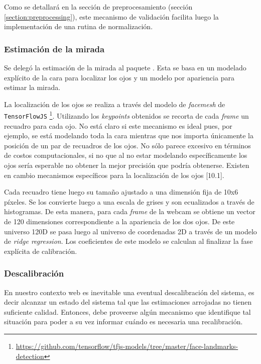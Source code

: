 Como se detallará en la sección de preprocesamiento (sección
\ref{section:preprocessing}), este mecanismo de validación facilita luego la
implementación de una rutina de normalización.

\subsubsection{Estimación de la mirada}

Se delegó la estimación de la mirada al paquete \webgazer
\cite{papoutsaki_2016_webgazer}.
Esta se basa en un modelado explícito de la cara para localizar los ojos y un
modelo por apariencia para estimar la mirada.

La localización de los ojos se realiza a través del modelo de \textit{facemesh}
de \texttt{TensorFlowJS}
\footnote{\url{https://github.com/tensorflow/tfjs-models/tree/master/face-landmarks-detection}}.
Utilizando los \textit{keypoints} obtenidos se recorta de cada \textit{frame}
un recuadro para cada ojo.
No está claro si este mecanismo es ideal pues, por ejemplo, se está modelando
toda la cara mientras que nos importa únicamente la posición de un par de
recuadros de los ojos.
No sólo parece excesivo en términos de costos computacionales, si no que al no
estar modelando específicamente los ojos sería esperable no obtener la mejor
precisión que podría obtenerse.
Existen en cambio mecanismos específicos para la localización de los ojos
[10.1].

Cada recuadro tiene luego su tamaño ajustado a una dimensión fija de 10x6
píxeles.
Se los convierte luego a una escala de grises y son ecualizados a través de
histogramas.
De esta manera, para cada \textit{frame} de la webcam se obtiene un vector de
120 dimensiones correspondiente a la apariencia de los dos ojos.
De este universo 120D se pasa luego al universo de coordenadas 2D a través de
un modelo de \textit{ridge regression}.
Los coeficientes de este modelo se calculan al finalizar la fase explícita de
calibración.

\subsubsection{Descalibración}

En nuestro contexto web es inevitable una eventual descalibración del sistema,
es decir alcanzar un estado del sistema tal que las estimaciones arrojadas no
tienen suficiente calidad.
Entonces, debe proveerse algún mecanismo que identifique tal situación para
poder a su vez informar cuándo es necesaria una recalibración.

